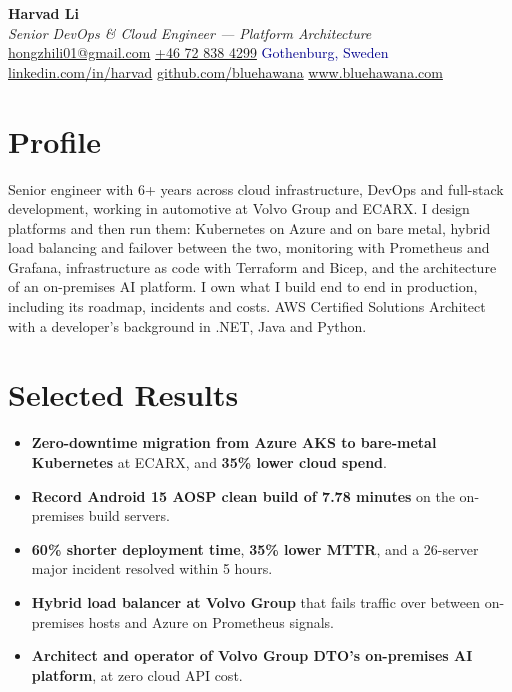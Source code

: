 \documentclass[a4paper,10pt]{article}
\begin{document}
\pagestyle{empty}

\begin{center}
{\LARGE \textbf{Harvad Li}}\\[8pt]
{\Large \textit{Senior DevOps \& Cloud Engineer --- Platform Architecture}}\\[8pt]
\textcolor{darkblue}{
  \href{mailto:hongzhili01@gmail.com}{hongzhili01@gmail.com} \textbar{}
  \href{tel:+46728384299}{+46 72 838 4299} \textbar{}
  Gothenburg, Sweden
}\\[3pt]
\textcolor{darkblue}{
  \href{https://www.linkedin.com/in/harvad/}{linkedin.com/in/harvad} \textbar{}
  \href{https://github.com/bluehawana}{github.com/bluehawana} \textbar{}
  \href{https://www.bluehawana.com}{www.bluehawana.com}
}
\end{center}

\section*{Profile}
Senior engineer with 6+ years across cloud infrastructure, DevOps and full-stack development, working in automotive at Volvo Group and ECARX. I design platforms and then run them: Kubernetes on Azure and on bare metal, hybrid load balancing and failover between the two, monitoring with Prometheus and Grafana, infrastructure as code with Terraform and Bicep, and the architecture of an on-premises AI platform. I own what I build end to end in production, including its roadmap, incidents and costs. AWS Certified Solutions Architect with a developer's background in .NET, Java and Python.

\section*{Selected Results}
\begin{itemize}
  \item \textbf{Zero-downtime migration from Azure AKS to bare-metal Kubernetes} at ECARX, and \textbf{35\% lower cloud spend}.
  \item \textbf{Record Android 15 AOSP clean build of 7.78 minutes} on the on-premises build servers.
  \item \textbf{60\% shorter deployment time}, \textbf{35\% lower MTTR}, and a 26-server major incident resolved within 5 hours.
  \item \textbf{Hybrid load balancer at Volvo Group} that fails traffic over between on-premises hosts and Azure on Prometheus signals.
  \item \textbf{Architect and operator of Volvo Group DTO's on-premises AI platform}, at zero cloud API cost.
\end{itemize}
\end{document}
